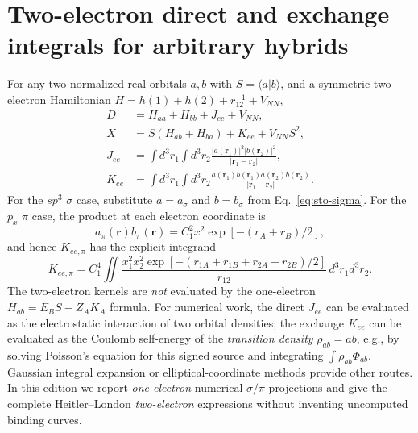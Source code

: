\documentclass[11pt,letterpaper]{article}
\begin{document}
\section{Two-electron direct and exchange integrals for arbitrary hybrids}\label{app:twoelectron}
For any two normalized real orbitals $a,b$ with $S=\langle a|b\rangle$, and a symmetric two-electron Hamiltonian $H=h(1)+h(2)+r_{12}^{-1}+V_{NN}$,
\begin{align}
D&=H_{aa}+H_{bb}+J_{ee}+V_{NN},\\
X&=S(H_{ab}+H_{ba})+K_{ee}+V_{NN}S^2,\\
J_{ee}&=\int d^3r_1\int d^3r_2\frac{|a(\mathbf r_1)|^2|b(\mathbf r_2)|^2}{|\mathbf r_1-\mathbf r_2|},\\
K_{ee}&=\int d^3r_1\int d^3r_2\frac{a(\mathbf r_1)b(\mathbf r_1)a(\mathbf r_2)b(\mathbf r_2)}{|\mathbf r_1-\mathbf r_2|}.
\end{align}
For the $sp^3$ $\sigma$ case, substitute $a=a_\sigma$ and $b=b_\sigma$ from Eq.~\eqref{eq:sto-sigma}. For the $p_x$ $\pi$ case, the product at each electron coordinate is
\begin{equation}
a_\pi(\mathbf r)b_\pi(\mathbf r)
=C_1^2x^2\exp[-(r_A+r_B)/2],
\end{equation}
and hence $K_{ee,\pi}$ has the explicit integrand
\begin{equation}
K_{ee,\pi}=C_1^4\iint \frac{x_1^2x_2^2\exp[-(r_{1A}+r_{1B}+r_{2A}+r_{2B})/2]}{r_{12}}\,d^3r_1d^3r_2.
\end{equation}
The two-electron kernels are \emph{not} evaluated by the one-electron $H_{ab}=E_BS-Z_AK_A$ formula. For numerical work, the direct $J_{ee}$ can be evaluated as the electrostatic interaction of two orbital densities; the exchange $K_{ee}$ can be evaluated as the Coulomb self-energy of the \emph{transition density} $\rho_{ab}=ab$, e.g., by solving Poisson's equation for this signed source and integrating $\int\rho_{ab}\Phi_{ab}$. Gaussian integral expansion or elliptical-coordinate methods provide other routes. In this edition we report \emph{one-electron} numerical $\sigma/\pi$ projections and give the complete Heitler--London \emph{two-electron} expressions without inventing uncomputed binding curves.
\end{document}
